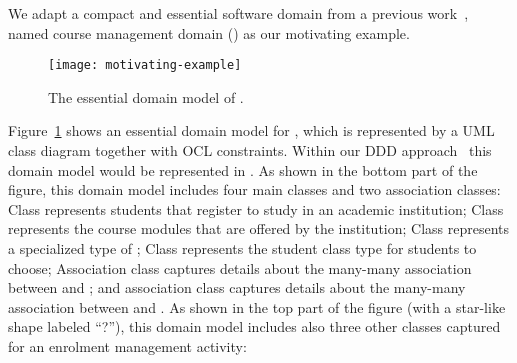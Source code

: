 We adapt a compact and essential software domain from a previous work~\cite{le_domain_2018}, named course management domain (\courseman) as our motivating example. %

\begin{figure}[th]
	\begin{center}
		\texttt{[image: motivating-example]}
	\end{center}
    \vspace{-0.1cm}
	\caption{The essential domain model of \courseman.}
	\label{fig:motivatingExample}
\end{figure}

Figure~\ref{fig:motivatingExample} shows an essential domain model for , which is represented by a UML class diagram together with OCL constraints. Within our DDD approach~\cite{le_domain_2018} this domain model would be represented in \dcsl. As shown in the bottom part of the figure, this domain model includes four main classes and two association classes: Class  represents students that register to study in an academic institution; Class  represents the course modules that are offered by the institution; Class  represents a specialized type of ; Class  represents the student class type for students to choose; Association class  captures details about the many-many association between  and ; and association class  captures details about the many-many association between  and .
As shown in the top part of the figure (with a star-like shape labeled ``?''), this domain model includes also three other classes captured for an enrolment management activity: 
%

